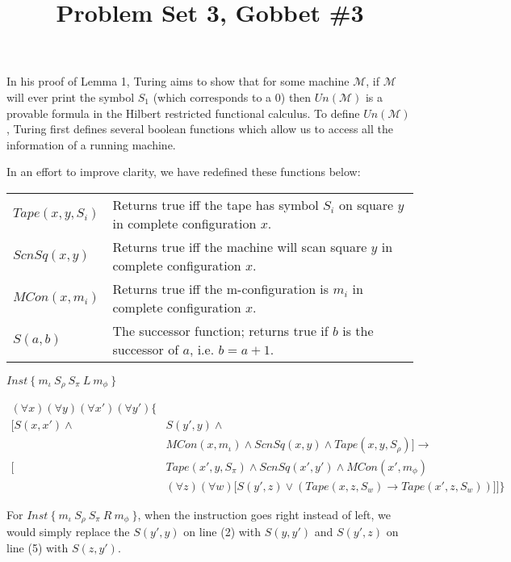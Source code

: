 \documentclass[11pt]{article}
\title{\textbf{Problem Set 3, Gobbet \#3}}
\author{}
\date{}
\newcommand{\?}{\stackrel{?}{=}}
\begin{document}
\maketitle

In his proof of Lemma 1, Turing aims to show that for some machine $\mathscr{M}$, if $\mathscr{M}$ will ever print the symbol $S_1$ (which corresponds to a 0) then $Un(\mathscr{M})$ is a provable formula in the Hilbert restricted functional calculus. To define $Un(\mathscr{M})$, Turing first defines several boolean functions which allow us to access all the information of a running machine.

In an effort to improve clarity, we have redefined these functions below:

\vspace{1cm}
{\renewcommand{\arraystretch}{2}
\begin{tabular}{p{3cm} p{8cm}}
$Tape(x, y, S_i)$ & Returns true iff the tape has symbol $S_i$ on square $y$ in complete configuration $x$. \\ 
$ScnSq(x, y)$ & Returns true iff the machine will scan square $y$ in complete configuration $x$. \\ 
$MCon(x, m_i)$ & Returns true iff the m-configuration is $m_i$ in complete configuration $x$.\\ 
$S(a, b)$ & The successor function; returns true if $b$ is the successor of $a$, i.e. $b = a + 1$. \\ 
\end{tabular} 
}
\vspace{1cm}

$Inst \ \{ \ m_\iota \ S_\rho \ S_\pi \ L \ m_\phi \ \}$ 

\begin{align}
(\forall x)(\forall y)(\forall x')(\forall y') \bigg\{ & \\
\Big[ S(x, x') \land & S(y', y) \land  \\
& MCon(x, m_\iota) \land ScnSq(x, y) \land Tape(x, y, S_\rho) \Big] \to \\
\Big[ &Tape(x', y, S_\pi) \land ScnSq(x', y') \land MCon(x', m_\phi) \\
&(\forall z)(\forall w) \big[ S(y',z) \lor (Tape(x,z,S_w) \to Tape(x',z,S_w) ) \big] \Big] \bigg\}
\end{align}

For $Inst \ \{ \ m_\iota \ S_\rho \ S_\pi \ R \ m_\phi \ \}$, when the instruction goes right instead of left, we would simply replace the  $S(y', y)$ on line (2) with $S(y, y')$ and $S(y',z)$ on line (5) with $S(z, y')$. 
\end{document}
